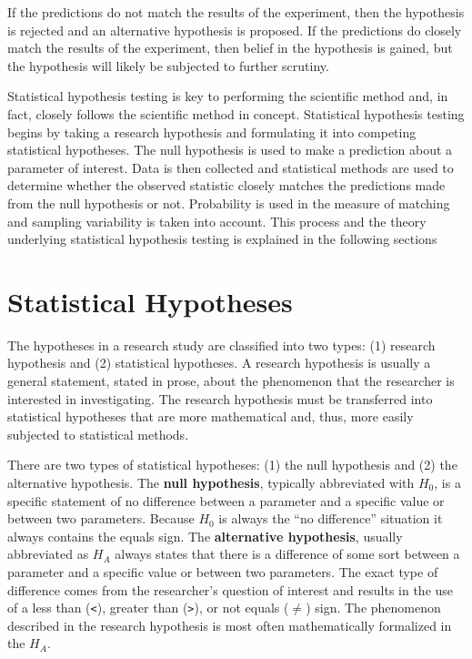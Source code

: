 \documentclass[10pt,openany]{book}\usepackage[]{graphicx}\usepackage[]{color}
\begin{document}
If the predictions do not match the results of the experiment, then the hypothesis is rejected and an alternative hypothesis is proposed.  If the predictions do closely match the results of the experiment, then belief in the hypothesis is gained, but the hypothesis will likely be subjected to further scrutiny.

Statistical hypothesis testing is key to performing the scientific method and, in fact, closely follows the scientific method in concept.  Statistical hypothesis testing begins by taking a research hypothesis and formulating it into competing statistical hypotheses.  The null hypothesis is used to make a prediction about a parameter of interest.  Data is then collected and statistical methods are used to determine whether the observed statistic closely matches the predictions made from the null hypothesis or not.  Probability is used in the measure of matching and sampling variability is taken into account.  This process and the theory underlying statistical hypothesis testing is explained in the following sections


\section{Statistical Hypotheses} \label{sec:Hypotheses}
The hypotheses in a research study are classified into two types: (1) research hypothesis and (2) statistical hypotheses.  A research hypothesis is usually a general statement, stated in prose, about the phenomenon that the researcher is interested in investigating.  The research hypothesis must be transferred into statistical hypotheses that are more mathematical and, thus, more easily subjected to statistical methods.


\vspace{-12pt}

There are two types of statistical hypotheses: (1) the null hypothesis and (2) the alternative hypothesis.  The \textbf{null hypothesis}, typically abbreviated with $H_{0}$, is a specific statement of no difference between a parameter and a specific value or between two parameters.  Because $H_{0}$ is always the ``no difference'' situation it always contains the equals sign.  The \textbf{alternative hypothesis}, usually abbreviated as $H_{A}$ always states that there is a difference of some sort between a parameter and a specific value or between two parameters.  The exact type of difference comes from the researcher's question of interest and results in the use of a less than (\verb"<"), greater than (\verb">"), or not equals ($\neq$) sign.  The phenomenon described in the research hypothesis is most often mathematically formalized in the $H_{A}$.
\end{document}
